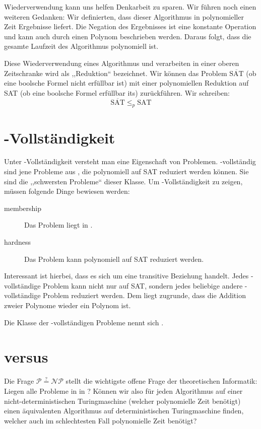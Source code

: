 Wiederverwendung kann uns helfen Denkarbeit zu sparen. Wir führen noch einen weiteren Gedanken: Wir definierten, dass dieser Algorithmus in polynomieller Zeit Ergebnisse liefert. Die Negation des Ergebnisses ist eine konstante Operation und kann auch durch einen Polynom beschrieben werden. Daraus folgt, dass die gesamte Laufzeit des Algorithmus polynomiell ist.

Diese Wiederverwendung eines Algorithmus und verarbeiten in einer oberen Zeitschranke wird als ,,Reduktion`` bezeichnet. Wir können das Problem $\overline{\text{SAT}}$ (ob eine boolsche Formel nicht erfüllbar ist) mit einer polynomiellen Reduktion auf SAT (ob eine boolsche Formel erfüllbar its) zurückführen. Wir schreiben:
\[
    \overline{\text{SAT}} \leq_p \text{SAT}
\]

\section{\cNP{}-Vollständigkeit}
%
Unter \cNP{}-Vollständigkeit versteht man eine Eigenschaft von Problemen. \cNP{}-vollständig sind jene Probleme aus
\cNP{}, die polynomiell auf SAT reduziert werden können. Sie sind die ,,schwersten Probleme`` dieser Klasse. Um \cNP{}-Vollständigkeit zu zeigen, müssen folgende Dinge bewiesen werden:
\begin{description}
  \item[membership] Das Problem liegt in \cNP{}.
  \item[hardness] Das Problem kann polynomiell auf SAT reduziert werden.
\end{description}

Interessant ist hierbei, dass es sich um eine transitive Beziehung handelt. Jedes \cNP{}-vollständige Problem kann nicht nur auf SAT, sondern jedes beliebige andere \cNP{}-vollständige Problem reduziert werden. Dem liegt zugrunde, dass die Addition zweier Polynome wieder ein Polynom ist.

Die Klasse der \cNP{}-vollständigen Probleme nennt sich \cNPC{}.
%
\section{\cP{} versus \cNP{}}
%
Die Frage $\mathcal{P} \stackrel{?}{=} \mathcal{NP}$ stellt die wichtigste offene Frage der theoretischen Informatik: Liegen alle Probleme in \cNP{} in \cP{}? Können wir also für jeden Algorithmus auf einer nicht-deterministischen Turingmaschine (welcher polynomielle Zeit benötigt) einen äquivalenten Algorithmus auf deterministischen Turingmaschine finden, welcher auch im schlechtesten Fall polynomielle Zeit benötigt?

